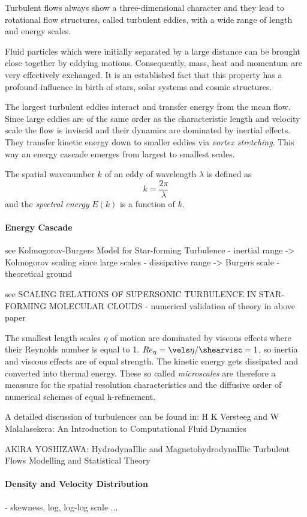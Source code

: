 Turbulent flows always show a three-dimensional character and they lead to
rotational flow structures, called turbulent eddies, with a wide range of
length and energy scales.

Fluid particles which were initially separated by a large distance can be
brought close together by eddying motions. Consequently, mass, heat and momentum
are very effectively exchanged. It is an established fact that this
property has a profound influence in birth of stars, solar systems and cosmic
structures.

The largest turbulent eddies interact and transfer energy from the mean flow.
Since large eddies are of the same order as the characteristic length and
velocity scale the flow is inviscid and their dynamics are dominated by
inertial effects. They transfer kinetic energy down to smaller eddies via
\emph{vortex stretching}. This way an energy cascade emerges from largest to
smallest scales.

The spatial wavenumber $k$ of an eddy of wavelength $\lambda$ is defined as
\begin{equation}
    k = \frac{2\pi}{\lambda}
\end{equation}
and the \emph{spectral energy} $E(k)$ is a function of $k$.
\paragraph{Energy Cascade}

see Kolmogorov-Burgers Model for Star-forming Turbulence
    - inertial range -> Kolmogorov scaling since large scales
    - dissipative range -> Burgers scale
    - theoretical ground

see SCALING RELATIONS OF SUPERSONIC TURBULENCE IN STAR-FORMING MOLECULAR CLOUDS
    - numerical validation of theory in above paper




The smallest length scales $\eta$ of motion are dominated by viscous effects
where their Reynolds number is equal to 1. $Re_{\eta} = \vels \eta / \shearvisc = 1$,
so inertia and viscous effects are of equal strength. The kinetic energy
gets dissipated and converted into thermal energy. These so called
 \emph{microscales} are therefore a meassure for the spatial
resolution characteristics and the diffusive order of numerical schemes of equal
h-refinement.

A detailed discussion of turbulences can be found in:
H K Versteeg and W Malalasekera: An Introduction to Computational Fluid Dynamics


AKlRA YOSHIZAWA: HydrodynaIllic and MagnetohydrodynaIllic Turbulent Flows Modelling and
Statistical Theory


\paragraph{Density and Velocity Distribution}
    - skewness, log, log-log scale ...




